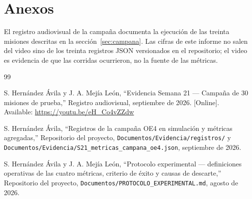 \documentclass[12pt,letterpaper]{article}
\begin{document}
\section{Anexos}

El registro audiovisual de la campaña documenta la ejecución de las treinta misiones descritas en la sección~\ref{sec:campana}. Las cifras de este informe no salen del video sino de los treinta registros JSON versionados en el repositorio; el video es evidencia de que las corridas ocurrieron, no la fuente de las métricas.

\begin{thebibliography}{99}

S. Hernández Ávila y J. A. Mejía León,
``Evidencia Semana 21 --- Campaña de 30 misiones de prueba,''
Registro audiovisual, septiembre de 2026. [Online]. Available: \url{https://youtu.be/eH_Co4vZZdw}

S. Hernández Ávila,
``Registros de la campaña OE4 en simulación y métricas agregadas,''
Repositorio del proyecto, \texttt{Documentos/Evidencia/registros/} y
\texttt{Documentos/Evidencia/S21\_metricas\_campana\_oe4.json}, septiembre de 2026.

S. Hernández Ávila y J. A. Mejía León,
``Protocolo experimental --- definiciones operativas de las cuatro métricas, criterio de éxito y causas de descarte,''
Repositorio del proyecto, \texttt{Documentos/PROTOCOLO\_EXPERIMENTAL.md}, agosto de 2026.

\end{thebibliography}
\end{document}
